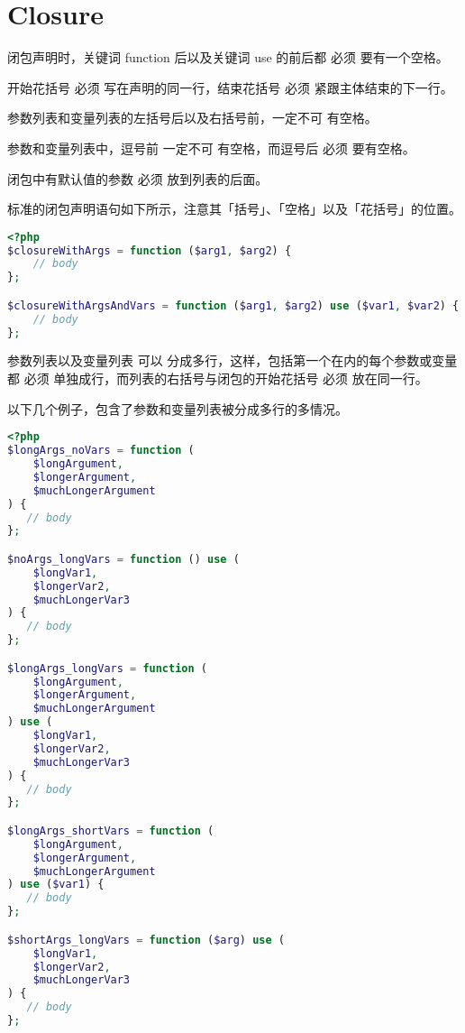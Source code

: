 \section{Closure}

\begin{compactitem}
\item 闭包声明时，关键词 function 后以及关键词 use 的前后都 必须 要有一个空格。

\item 开始花括号 必须 写在声明的同一行，结束花括号 必须 紧跟主体结束的下一行。

\item 参数列表和变量列表的左括号后以及右括号前，一定不可 有空格。

\item 参数和变量列表中，逗号前 一定不可 有空格，而逗号后 必须 要有空格。

\item 闭包中有默认值的参数 必须 放到列表的后面。
\end{compactitem}

标准的闭包声明语句如下所示，注意其「括号」、「空格」以及「花括号」的位置。





\begin{lstlisting}[language=PHP]
<?php
$closureWithArgs = function ($arg1, $arg2) {
    // body
};

$closureWithArgsAndVars = function ($arg1, $arg2) use ($var1, $var2) {
    // body
};
\end{lstlisting}

参数列表以及变量列表 可以 分成多行，这样，包括第一个在内的每个参数或变量都 必须 单独成行，而列表的右括号与闭包的开始花括号 必须 放在同一行。

以下几个例子，包含了参数和变量列表被分成多行的多情况。

\begin{lstlisting}[language=PHP]
<?php
$longArgs_noVars = function (
    $longArgument,
    $longerArgument,
    $muchLongerArgument
) {
   // body
};

$noArgs_longVars = function () use (
    $longVar1,
    $longerVar2,
    $muchLongerVar3
) {
   // body
};

$longArgs_longVars = function (
    $longArgument,
    $longerArgument,
    $muchLongerArgument
) use (
    $longVar1,
    $longerVar2,
    $muchLongerVar3
) {
   // body
};

$longArgs_shortVars = function (
    $longArgument,
    $longerArgument,
    $muchLongerArgument
) use ($var1) {
   // body
};

$shortArgs_longVars = function ($arg) use (
    $longVar1,
    $longerVar2,
    $muchLongerVar3
) {
   // body
};
\end{lstlisting}

